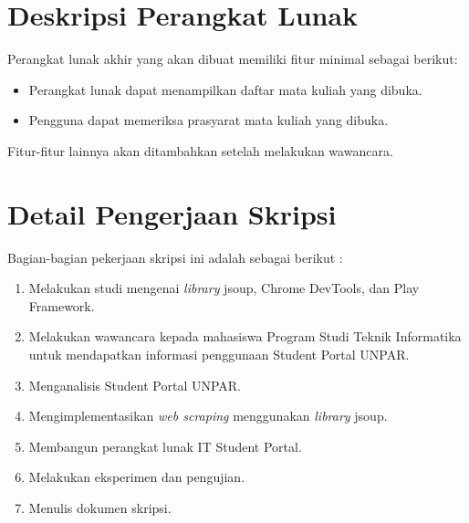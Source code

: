 \documentclass[a4paper,twoside]{article}
\begin{document}
\section{Deskripsi Perangkat Lunak}
Perangkat lunak akhir yang akan dibuat memiliki fitur minimal sebagai berikut:
\begin{itemize}
	\item Perangkat lunak dapat menampilkan daftar mata kuliah yang dibuka.
	\item Pengguna dapat memeriksa prasyarat mata kuliah yang dibuka.
\end{itemize}
Fitur-fitur lainnya akan ditambahkan setelah melakukan wawancara.

\section{Detail Pengerjaan Skripsi}
Bagian-bagian pekerjaan skripsi ini adalah sebagai berikut :
	\begin{enumerate}
		\item Melakukan studi mengenai \textit{library} jsoup, Chrome DevTools, dan Play Framework.
		\item Melakukan wawancara kepada mahasiswa Program Studi Teknik Informatika untuk mendapatkan informasi penggunaan Student Portal UNPAR.
		\item Menganalisis Student Portal UNPAR.
		\item Mengimplementasikan \textit{web scraping} menggunakan \textit{library} jsoup.
		\item Membangun perangkat lunak IT Student Portal.
		\item Melakukan eksperimen dan pengujian.
		\item Menulis dokumen skripsi.
	\end{enumerate}
\end{document}
